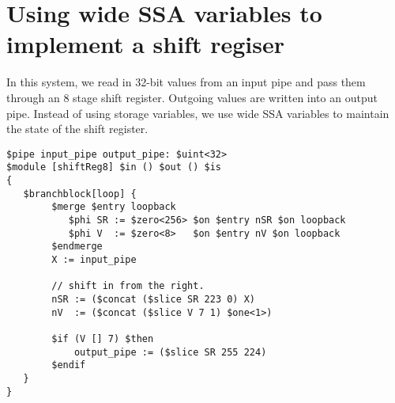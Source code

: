 \documentclass[12pt]{article}
\begin{document}
\section{Using wide SSA variables to implement a shift regiser}

In this system, we read in 32-bit values from an input pipe and pass them through
an 8 stage shift register.   Outgoing values are written into
an output pipe.  Instead of using storage variables, we use wide
SSA variables to maintain the state of the shift register.

\begin{verbatim}
$pipe input_pipe output_pipe: $uint<32>
$module [shiftReg8] $in () $out () $is
{
   $branchblock[loop] {
        $merge $entry loopback
           $phi SR := $zero<256> $on $entry nSR $on loopback
           $phi V  := $zero<8>   $on $entry nV $on loopback
        $endmerge
        X := input_pipe

        // shift in from the right.
        nSR := ($concat ($slice SR 223 0) X)
        nV  := ($concat ($slice V 7 1) $one<1>)

        $if (V [] 7) $then
            output_pipe := ($slice SR 255 224)
        $endif
   }
}
\end{verbatim}
\end{document}
